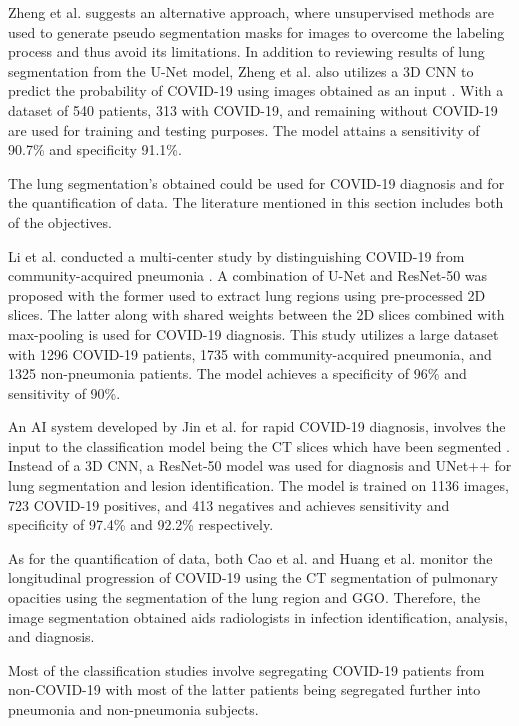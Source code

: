 Zheng et al. suggests an alternative approach, where unsupervised methods are used to generate pseudo segmentation masks for images to overcome 
the labeling process and thus avoid its limitations. In addition to reviewing results of lung segmentation from the U-Net model, Zheng et al. also utilizes a 3D CNN to predict the probability of 
COVID-19 using images obtained as an input \cite{CXZ+2020}. With a 
dataset of 540 patients, 313 with COVID-19, and remaining without COVID-19 
are used for training and testing purposes. The model attains a sensitivity 
of 90.7\% and specificity 91.1\%.

The lung segmentation's obtained could be used for COVID-19 diagnosis and for the 
quantification of data. The literature mentioned in this section includes both of the 
objectives.

Li et al. conducted a multi-center study by distinguishing COVID-19 from community-acquired pneumonia \cite{LLL+2020}. A combination of U-Net and ResNet-50 was proposed with the former used to extract lung regions using pre-processed 2D slices. The latter along with shared weights between the 2D slices combined 
with max-pooling is used for COVID-19 diagnosis. This study utilizes a large dataset 
with 1296 COVID-19 patients, 1735 with community-acquired pneumonia, and 1325 
non-pneumonia patients. The model achieves a specificity of 96\% and sensitivity 
of 90\%.  

An AI system developed by Jin et al. for rapid COVID-19 diagnosis, involves the input to the classification model 
being the CT slices which have been segmented \cite{JSB+2020}. Instead of a 3D CNN, a ResNet-50 model was used for diagnosis
and UNet++ for lung segmentation and lesion identification. The model 
is trained on 1136 images, 723 COVID-19 positives, and 413 negatives and 
achieves sensitivity and specificity of 97.4\% and 92.2\% respectively.

As for the quantification of data, both Cao et al. \cite{CYZ+2020} and Huang et al. \cite{HLR+2020} monitor the longitudinal 
progression of COVID-19 using the CT segmentation of pulmonary opacities using the segmentation of 
the lung region and GGO. Therefore, the image segmentation obtained aids radiologists 
in infection identification, analysis, and diagnosis.

Most of the classification studies involve segregating COVID-19 patients 
from non-COVID-19 with most of the latter patients being segregated further 
into pneumonia and non-pneumonia subjects.

